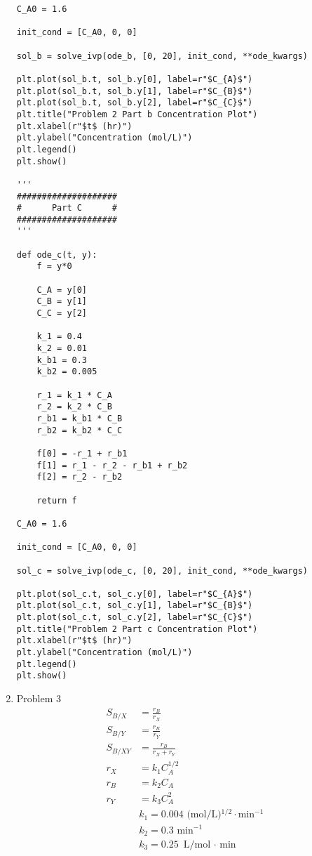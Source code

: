 \documentclass[12pt]{article}
\begin{document}
\begin{enumerate}
\begin{verbatim}
C_A0 = 1.6

init_cond = [C_A0, 0, 0]

sol_b = solve_ivp(ode_b, [0, 20], init_cond, **ode_kwargs)

plt.plot(sol_b.t, sol_b.y[0], label=r"$C_{A}$")
plt.plot(sol_b.t, sol_b.y[1], label=r"$C_{B}$")
plt.plot(sol_b.t, sol_b.y[2], label=r"$C_{C}$")
plt.title("Problem 2 Part b Concentration Plot")
plt.xlabel(r"$t$ (hr)")
plt.ylabel("Concentration (mol/L)")
plt.legend()
plt.show()

'''
####################
#      Part C      #
####################
'''

def ode_c(t, y):
    f = y*0

    C_A = y[0]
    C_B = y[1]
    C_C = y[2]

    k_1 = 0.4
    k_2 = 0.01
    k_b1 = 0.3
    k_b2 = 0.005

    r_1 = k_1 * C_A
    r_2 = k_2 * C_B
    r_b1 = k_b1 * C_B
    r_b2 = k_b2 * C_C

    f[0] = -r_1 + r_b1
    f[1] = r_1 - r_2 - r_b1 + r_b2
    f[2] = r_2 - r_b2

    return f

C_A0 = 1.6

init_cond = [C_A0, 0, 0]

sol_c = solve_ivp(ode_c, [0, 20], init_cond, **ode_kwargs)

plt.plot(sol_c.t, sol_c.y[0], label=r"$C_{A}$")
plt.plot(sol_c.t, sol_c.y[1], label=r"$C_{B}$")
plt.plot(sol_c.t, sol_c.y[2], label=r"$C_{C}$")
plt.title("Problem 2 Part c Concentration Plot")
plt.xlabel(r"$t$ (hr)")
plt.ylabel("Concentration (mol/L)")
plt.legend()
plt.show()
\end{verbatim}

\newpage
    \item Problem 3
    \begin{align*}
        S_{B/X} &= \frac{r_B}{r_X} \\
        S_{B/Y} &= \frac{r_B}{r_Y} \\
        S_{B/XY} &= \frac{r_B}{r_X + r_Y} \\
        r_X &= k_1 C_A^{1/2} \\
        r_B &= k_2 C_A \\
        r_Y &= k_3 C_A^2 \\
        & k_1 = 0.004 \text{ (mol/L)$^{1/2} \cdot$min$^{-1}$} \\
        & k_2 = 0.3 \text{ min$^{-1}$} \\
        & k_3 = 0.25 \text{ L/mol $\cdot$ min}
    \end{align*}


\end{enumerate}
\end{document}
